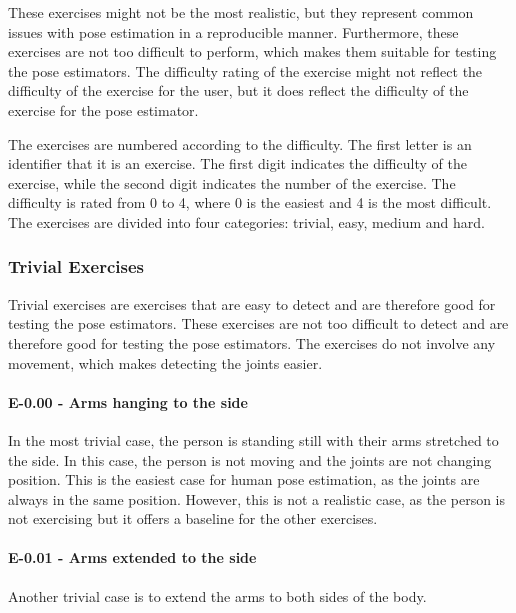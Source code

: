 These exercises might not be the most realistic, but they represent common issues with pose estimation in a reproducible manner. Furthermore, these exercises are not too difficult to perform, which makes them suitable for testing the pose estimators. The difficulty rating of the exercise might not reflect the difficulty of the exercise for the user, but it does reflect the difficulty of the exercise for the pose estimator.

The exercises are numbered according to the difficulty. The first letter is an identifier that it is an exercise. The first digit indicates the difficulty of the exercise, while the second digit indicates the number of the exercise. The difficulty is rated from 0 to 4, where 0 is the easiest and 4 is the most difficult. The exercises are divided into four categories: trivial, easy, medium and hard.


\subsubsection{Trivial Exercises}

Trivial exercises are exercises that are easy to detect and are therefore good for testing the pose estimators. These exercises are not too difficult to detect and are therefore good for testing the pose estimators. The exercises do not involve any movement, which makes detecting the joints easier. 

\paragraph{E-0.00 - Arms hanging to the side}

In the most trivial case, the person is standing still with their arms stretched to the side. In this case, the person is not moving and the joints are not changing position. This is the easiest case for human pose estimation, as the joints are always in the same position. However, this is not a realistic case, as the person is not exercising but it offers a baseline for the other exercises.

\paragraph{E-0.01 - Arms extended to the side}

Another trivial case is to extend the arms to both sides of the body. 

